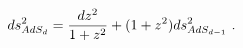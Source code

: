 \begin{equation}
ds_{AdS_d}^2= {dz^2\over 1+z^2} + (1+z^2) 
  ds^2_{AdS_{d-1}}\ .
\label{adsfour}
\end{equation}

